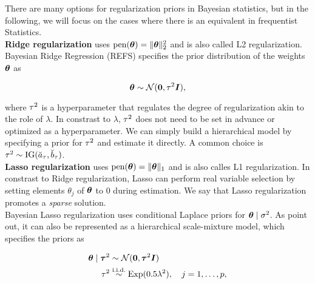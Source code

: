 
There are many options for regularization priors in Bayesian statistics, but in the following, we will focus on the cases where there is an equivalent in frequentist Statistics.\\

\textbf{Ridge regularization} uses $\text{pen}(\bm{\theta}) = \|\bm{\theta}\|_2^2$ and is also called L2 regularization.
Bayesian Ridge Regression (REFS) specifies the prior distribution of the weights $\bm{\theta}$ as

\begin{equation*}
    \bm{\theta} \sim \mathcal{N}(\bm{0}, \tau^2 \bm{I}),
\end{equation*}

where $\tau^2$ is a hyperparameter that regulates the degree of regularization akin to the role of $\lambda$.
In constrast to $\lambda$, $\tau^2$ does not need to be set in advance or optimized as a hyperparameter. We can simply build a hierarchical model by specifying a prior for $\tau^2$ and estimate it directly.
A common choice is $\tau^2 \sim \text{IG}(\breve{a}_\tau, \breve{b}_\tau)$. \\

\textbf{Lasso regularization} uses $\text{pen}(\bm{\theta}) = \|\bm{\theta}\|_1$ and is also calles L1 regularization.
In constrast to Ridge regularization, Lasso can perform real variable selection by setting elements $\theta_j$ of $\bm{\theta}$ to $0$ during estimation. We say that Lasso regularization promotes a \textit{sparse} solution. \\

Bayesian Lasso regularization uses conditional Laplace priors for $\bm{\theta} \mid \sigma^2$. As \citet{park_bayesian_2008} point out, it can also be represented as a hierarchical scale-mixture model, which specifies the priors as

\begin{equation}
    \begin{aligned}
        \bm{\theta} \mid \bm{\tau}^2 &\sim \mathcal{N}(\bm{0}, \bm{\tau}^2 \bm{I}) \\
        \tau^2 &\overset{\text{i.i.d.}}{\sim} \text{Exp}(0.5 \lambda^2), \quad j = 1, \dots, p,
    \end{aligned}
\end{equation}

